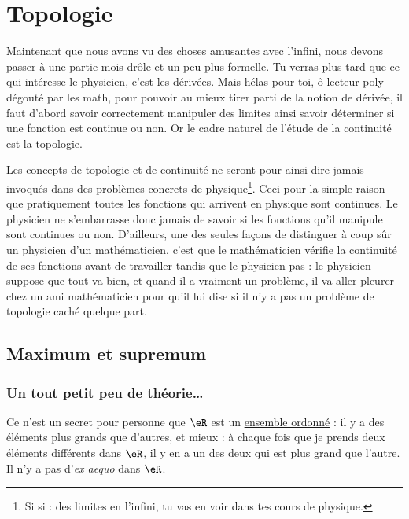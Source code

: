 \section{Topologie}

Maintenant que nous avons vu des choses amusantes avec l'infini, nous devons passer à une partie mois drôle et un peu plus formelle. Tu verras plus tard que ce qui intéresse le physicien, c'est les dérivées. Mais hélas pour toi, ô lecteur poly-dégouté par les math, pour pouvoir au mieux tirer parti de la notion de dérivée, il faut d'abord savoir correctement manipuler des limites ainsi savoir déterminer si une fonction est continue ou non. Or le cadre naturel de l'étude de la continuité est la topologie.

Les concepts de topologie et de continuité ne seront pour ainsi dire jamais invoqués dans des problèmes concrets de physique\footnote{Si si : des limites en l'infini, tu vas en voir dans tes cours de physique.}. Ceci pour la simple raison que pratiquement toutes les fonctions qui arrivent en physique sont continues. Le physicien ne s'embarrasse donc jamais de savoir si les fonctions qu'il manipule sont continues ou non. D'ailleurs, une des seules façons de distinguer à coup sûr un physicien d'un mathématicien, c'est que le mathématicien vérifie la continuité de ses fonctions avant de travailler tandis que le physicien pas : le physicien suppose que tout va bien, et quand il a vraiment un problème, il va aller pleurer chez un ami mathématicien pour qu'il lui dise si il n'y a pas un problème de topologie caché quelque part.

\subsection{Maximum et supremum}

\subsubsection{Un tout petit peu de théorie\ldots}

Ce n'est un secret pour personne que $\eR$ est un \href{http://fr.wikipedia.org/wiki/Relation_d'ordre}{ensemble ordonné} : il y a des éléments plus grands que d'autres, et mieux : à chaque fois que je prends deux éléments différents dans $\eR$, il y en a un des deux qui est plus grand que l'autre. Il n'y a pas d'\emph{ex aequo} dans $\eR$.

